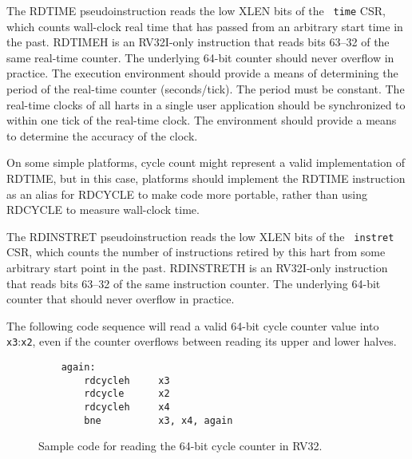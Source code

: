 The RDTIME pseudoinstruction reads the low XLEN bits of the {\tt
  time} CSR, which counts wall-clock real time that has passed from an
arbitrary start time in the past.  RDTIMEH is an RV32I-only instruction
that reads bits 63--32 of the same real-time counter.  The underlying 64-bit
counter should never overflow in practice.  The execution environment
should provide a means of determining the period of the real-time
counter (seconds/tick).  The period must be constant.  The
real-time clocks of all harts in a single user application
should be synchronized to within one tick of the real-time clock.  The
environment should provide a means to determine the accuracy of the
clock.

\begin{commentary}
On some simple platforms, cycle count might represent a valid
implementation of RDTIME, but in this case, platforms should implement
the RDTIME instruction as an alias for RDCYCLE to make code more
portable, rather than using RDCYCLE to measure wall-clock time.
\end{commentary}

The RDINSTRET pseudoinstruction reads the low XLEN bits of the {\tt
  instret} CSR, which counts the number of instructions retired by
this hart from some arbitrary start point in the past.  RDINSTRETH is
an RV32I-only instruction that reads bits 63--32 of the same
instruction counter. The underlying 64-bit counter that should never
overflow in practice.

The following code sequence will read a valid 64-bit cycle counter value into
{\tt x3}:{\tt x2}, even if the counter overflows between reading its upper
and lower halves.

\begin{figure}[h!]
\begin{center}
\begin{verbatim}
    again:
        rdcycleh     x3
        rdcycle      x2
        rdcycleh     x4
        bne          x3, x4, again
\end{verbatim}
\end{center}
\caption{Sample code for reading the 64-bit cycle counter in RV32.}
\label{critical}
\end{figure}


